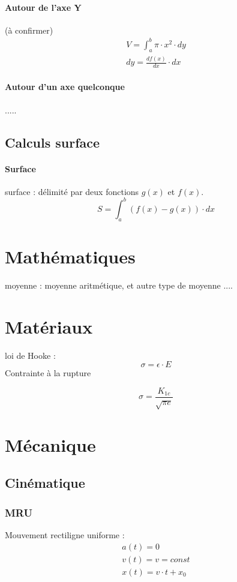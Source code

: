 \paragraph{Autour de l'axe Y}
(à confirmer)
\begin{eqnarray}
V=\int_{a}^{b}\pi \cdot x^2 \cdot dy\\
dy=\frac{df(x)}{dx}\cdot dx
\end{eqnarray}
\paragraph{Autour d'un axe quelconque}
.....
\subsection{Calculs surface}
\paragraph{Surface}
surface : délimité par deux fonctions $g(x)$ et $f(x)$. 
\begin{equation}
S=\int_{a}^{b} (f(x)-g(x)) \cdot dx
\end{equation}
\newpage
\section{Mathématiques}
moyenne : moyenne aritmétique, et autre type de moyenne ....

\newpage
\section{Matériaux}
loi de Hooke :
\begin{equation}
\sigma = \epsilon \cdot E 
\end{equation}
Contrainte à la rupture 

\begin{equation}
\sigma=\frac{K_{1c}}{\sqrt{\pi e}}
\end{equation}


\newpage
\section{Mécanique}


\subsection{Cinématique}
\subsubsection{MRU}
Mouvement rectiligne uniforme :
\begin{eqnarray}
a(t)=0\\
v(t)=v=const\\
x(t)=v \cdot t + x_0
\end{eqnarray}

